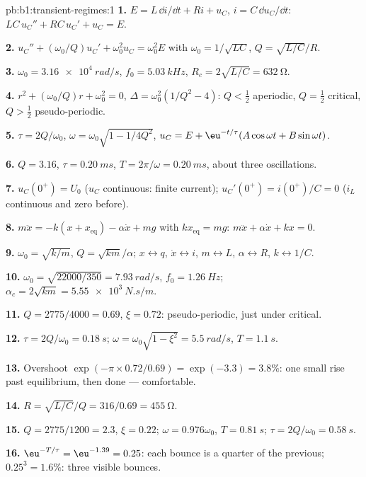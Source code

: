 \begin{solution}{pb:b1:transient-regimes:1}
\textbf{1.} $E = L\,\dd i/\dd t + Ri + u_C$, $i = C\,\dd u_C/\dd t$:
$LC\,u_C'' + RC\,u_C' + u_C = E$.

\textbf{2.} $u_C'' + (\omega_0/Q)u_C' + \omega_0^2u_C = \omega_0^2E$ with
$\omega_0 = 1/\sqrt{LC}$, $Q = \sqrt{L/C}/R$.

\textbf{3.} $\omega_0 = \qty{3.16e4}{rad/s}$, $f_0 = \qty{5.03}{kHz}$,
$R_c = 2\sqrt{L/C} = \qty{632}{\ohm}$.

\textbf{4.} $r^2 + (\omega_0/Q)r + \omega_0^2 = 0$, $\Delta = \omega_0^2(1/Q^2
- 4)$: $Q < \tfrac12$ aperiodic, $Q = \tfrac12$ critical, $Q > \tfrac12$
pseudo-periodic.

\textbf{5.} $\tau = 2Q/\omega_0$, $\omega = \omega_0\sqrt{1 - 1/4Q^2}$,
$u_C = E + \eu^{-t/\tau}(A\cos\omega t + B\sin\omega t)$.

\textbf{6.} $Q = 3.16$, $\tau = \qty{0.20}{ms}$, $T = 2\pi/\omega =
\qty{0.20}{ms}$, about three oscillations.

\textbf{7.} $u_C(0^+) = U_0$ ($u_C$ continuous: finite current);
$u_C'(0^+) = i(0^+)/C = 0$ ($i_L$ continuous and zero before).

\textbf{8.} $m\ddot x = -k(x + x_{\text{eq}}) - \alpha\dot x + mg$ with
$kx_{\text{eq}} = mg$: $m\ddot x + \alpha\dot x + kx = 0$.

\textbf{9.} $\omega_0 = \sqrt{k/m}$, $Q = \sqrt{km}/\alpha$; $x \leftrightarrow
q$, $\dot x \leftrightarrow i$, $m \leftrightarrow L$, $\alpha \leftrightarrow
R$, $k \leftrightarrow 1/C$.

\textbf{10.} $\omega_0 = \sqrt{22000/350} = \qty{7.93}{rad/s}$, $f_0 =
\qty{1.26}{Hz}$; $\alpha_c = 2\sqrt{km} = \qty{5.55e3}{N.s/m}$.

\textbf{11.} $Q = 2775/4000 = 0.69$, $\xi = 0.72$: pseudo-periodic, just
under critical.

\textbf{12.} $\tau = 2Q/\omega_0 = \qty{0.18}{s}$; $\omega = \omega_0\sqrt{1
- \xi^2} = \qty{5.5}{rad/s}$, $T = \qty{1.1}{s}$.

\textbf{13.} Overshoot $\exp(-\pi \times 0.72/0.69) = \exp(-3.3) = 3.8\%$:
one small rise past equilibrium, then done --- comfortable.

\textbf{14.} $R = \sqrt{L/C}/Q = 316/0.69 = \qty{455}{\ohm}$.

\textbf{15.} $Q = 2775/1200 = 2.3$, $\xi = 0.22$; $\omega = 0.976\omega_0$,
$T = \qty{0.81}{s}$; $\tau = 2Q/\omega_0 = \qty{0.58}{s}$.

\textbf{16.} $\eu^{-T/\tau} = \eu^{-1.39} = 0.25$: each bounce is a
quarter of the previous; $0.25^3 = 1.6\%$: three visible bounces.


\end{solution}

